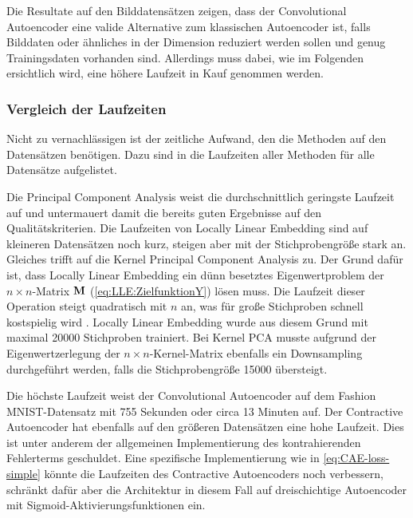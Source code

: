 Die Resultate auf den Bilddatensätzen zeigen, dass der Convolutional Autoencoder eine valide
Alternative zum klassischen Autoencoder ist, falls Bilddaten oder ähnliches in der Dimension
reduziert werden sollen und genug Trainingsdaten vorhanden sind. Allerdings muss dabei, wie im
Folgenden ersichtlich wird, eine höhere Laufzeit in Kauf genommen werden.

\subsubsection{Vergleich der Laufzeiten}

Nicht zu vernachlässigen ist der zeitliche Aufwand, den die Methoden auf den Datensätzen benötigen.
Dazu sind in  die Laufzeiten aller Methoden für alle Datensätze
aufgelistet.


Die Principal Component Analysis weist die durchschnittlich geringste Laufzeit auf und untermauert damit die bereits guten Ergebnisse auf den Qualitätskriterien. Die Laufzeiten von Locally Linear Embedding sind auf kleineren Datensätzen noch kurz, steigen aber mit der Stichprobengröße stark an. Gleiches trifft auf die Kernel Principal Component Analysis zu. Der Grund dafür ist, dass Locally Linear Embedding ein dünn besetztes Eigenwertproblem der $n \times n$-Matrix $\mathbf{M}$ (\eqref{eq:LLE:ZielfunktionY}) lösen muss. Die Laufzeit dieser Operation steigt quadratisch mit $n$ an, was für große Stichproben schnell kostspielig wird \parencite[9]{Saul.2000}. Locally Linear Embedding wurde aus diesem Grund mit maximal \num{20000}
Stichproben trainiert. Bei Kernel PCA musste aufgrund der Eigenwertzerlegung der $n \times
	n$-Kernel-Matrix ebenfalls ein Downsampling durchgeführt werden, falls die Stichprobengröße
\num{15000} übersteigt.

Die höchste Laufzeit weist der Convolutional Autoencoder auf dem Fashion MNIST-Datensatz mit 755
Sekunden oder circa 13 Minuten auf. Der Contractive Autoencoder hat ebenfalls auf den größeren
Datensätzen eine hohe Laufzeit. Dies ist unter anderem der allgemeinen Implementierung des
kontrahierenden Fehlerterms geschuldet. Eine spezifische Implementierung wie in
\eqref{eq:CAE-loss-simple} könnte die Laufzeiten des Contractive Autoencoders noch verbessern,
schränkt dafür aber die Architektur in diesem Fall auf dreischichtige Autoencoder mit
Sigmoid-Aktivierungsfunktionen ein.

